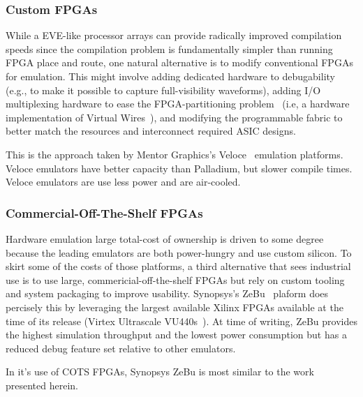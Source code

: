 \subsubsection{Custom FPGAs}
While a EVE-like processor arrays can provide radically improved compilation speeds since
the compilation problem is fundamentally simpler than running FPGA place and
route, one natural alternative is to modify conventional FPGAs for emulation.
This might involve adding dedicated hardware to debugability (e.g., to make it
possible to capture full-visibility waveforms), adding I/O multiplexing
hardware to ease the FPGA-partitioning problem ~(i.e, a hardware implementation of Virtual Wires~\cite{VirtualWires}), and modifying the programmable
fabric to better match the resources and interconnect required ASIC designs.

This is the approach taken by Mentor Graphics's Veloce~\cite{Veloce} emulation platforms.
Veloce emulators have better capacity than Palladium, but slower
compile times. Veloce emulators are use less power and are air-cooled.


\subsubsection{Commercial-Off-The-Shelf FPGAs}

Hardware emulation large total-cost of ownership is driven to some degree
because the leading emulators are both power-hungry and use custom silicon. To
skirt some of the costs of those platforms, a third alternative that sees
industrial use is to use large, commericial-off-the-shelf FPGAs but rely on
custom tooling and system packaging to improve usability. Synopsys's
ZeBu~\cite{ZeBu} plaform does percisely this by leveraging the largest
available Xilinx FPGAs available at the time of its release (Virtex Ultrascale
VU440s~\cite{ZeBu}). At time of writing, ZeBu provides the highest simulation
throughput and the lowest power consumption but has a reduced debug feature set
relative to other emulators.

In it's use of COTS FPGAs, Synopsys ZeBu is most similar to the work presented herein. 


